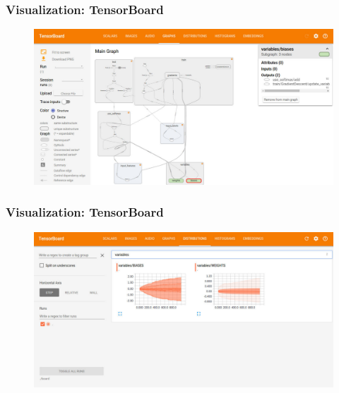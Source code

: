 %

\begin{frame}
	\MyLogo
	\frametitle{Visualization: TensorBoard}  
	
	\begin{figure}[htbp] 
		\includegraphics[width=\textwidth, height=\textheight]{figures/main_graph.pdf} 
	\end{figure}
	
	
\end{frame}

%

\begin{frame}
	\MyLogo
	\frametitle{Visualization: TensorBoard}  
	
	\begin{figure}[htbp] 
		\includegraphics[width=\textwidth, height=\textheight]{figures/distributions.pdf} 
	\end{figure}
	
	
\end{frame}

%

